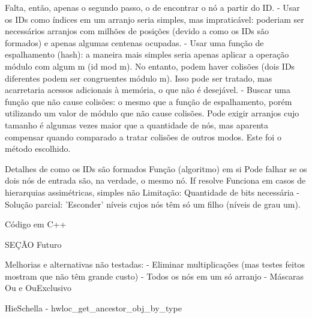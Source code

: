 \documentclass{ufsc-thesis}
\begin{document}
Falta, então, apenas o segundo passo, o de encontrar o nó a partir do ID.
- Usar os IDs como índices em um arranjo seria simples, mas impraticável:
poderiam ser necessários arranjos com milhões de posições (devido a como os IDs são formados) e apenas algumas centenas ocupadas.
- Usar uma função de espalhamento (hash): a maneira mais simples seria apenas aplicar a operação módulo com algum m (id mod m).
No entanto, podem haver colisões (dois IDs diferentes podem ser congruentes módulo m).
Isso pode ser tratado, mas acarretaria acessos adicionais à memória, o que não é desejável.
- Buscar uma função que não cause colisões: o mesmo que a função de espalhamento, porém utilizando um valor de módulo que não cause colisões.
Pode exigir arranjos cujo tamanho é algumas vezes maior que a quantidade de nós, mas aparenta compensar quando comparado a tratar colisões de outros modos.
Este foi o método escolhido.



Detalhes de como os IDs são formados
Função (algoritmo) em si
Pode falhar se os dois nós de entrada são, na verdade, o mesmo nó. If resolve
Funciona em casos de hierarquias assimétricas, simples não
Limitação: Quantidade de bits necessária - Solução parcial: 'Esconder' níveis cujos nós têm só um filho (níveis de grau um).


Código em C++


SEÇÃO Futuro

Melhorias e alternativas não testadas:
- Eliminar multiplicações (mas testes feitos mostram que não têm grande custo)
- Todos os nós em um só arranjo
- Máscaras Ou e OuExclusivo

HieSchella - hwloc\_get\_ancestor\_obj\_by\_type
\end{document}
